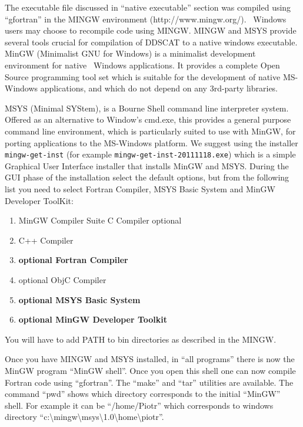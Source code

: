 The executable file discussed in {}``native executable'' section
was compiled using {}``gfortran'' in the MINGW environment 
(http://www.mingw.org/).
\Microsoft\ Windows users may choose to recompile code using MINGW. MINGW and
MSYS provide several tools crucial for compilation of DDSCAT to a native
windows executable. MinGW (\textquotedbl{}Minimalist GNU for
Windows\textquotedbl{}) is a minimalist development environment for
native \Microsoft\ Windows applications. It provides a complete Open
Source programming tool set which is suitable for the development
of native MS-Windows applications, and which do not depend on any
3rd-party libraries. 

MSYS (\textquotedbl{}Minimal SYStem\textquotedbl{}),
is a Bourne Shell command line interpreter system. Offered as an alternative
to Window's cmd.exe, this provides a general purpose command line
environment, which is particularly suited to use with MinGW, for porting
applications to the MS-Windows platform. We suggest using the installer
{\tt mingw-get-inst} (for example {\tt mingw-get-inst-20111118.exe}) which is
a simple Graphical User Interface installer that installs MinGW and
MSYS. During the GUI phase of the installation select the  default options, 
but from
the following list you need to select Fortran Compiler, MSYS Basic
System and MinGW Developer ToolKit:
\begin{enumerate}
\item MinGW Compiler Suite C Compiler optional
\item C++ Compiler 
\item {\bf optional Fortran Compiler} 
\item optional ObjC Compiler 
\item {\bf optional MSYS Basic System} 
\item {\bf optional MinGW Developer Toolkit}
\end{enumerate}
You will have to add PATH to bin directories as described in the MINGW.

Once you have MINGW and MSYS installed, in {}``all programs'' there is now the
MinGW program {}``MinGW shell''. Once you open this shell one can
now compile Fortran code using {}``gfortran''. The ``make'' and
``tar'' utilities are available. 
The command {}``pwd'' shows which directory corresponds to the initial
{}``MinGW'' shell. For example it can be {}``/home/Piotr'' which
corresponds to windows directory {}``c:\textbackslash{}mingw\textbackslash{}msys\textbackslash{}1.0\textbackslash{}home\textbackslash{}piotr''.

